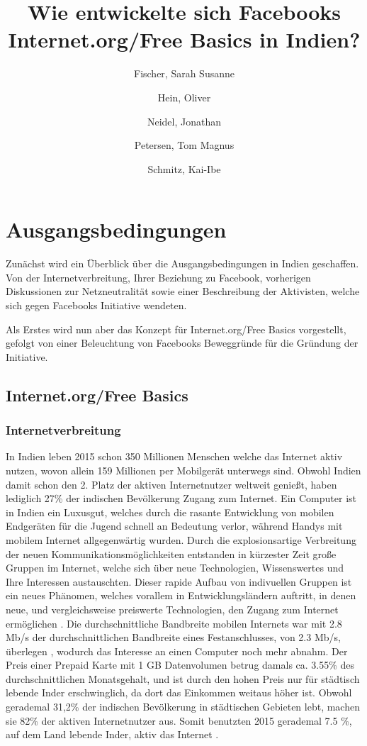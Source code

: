 \documentclass{article}
\title{Wie entwickelte sich Facebooks Internet.org/Free Basics in Indien?}
\author{
  Fischer, Sarah Susanne\\
  \and
  Hein, Oliver\\
  \and
  Neidel, Jonathan\\
  \and
  Petersen, Tom Magnus\\
  \and
  Schmitz, Kai-Ibe\\
}
\begin{document}
\maketitle

\section{Ausgangsbedingungen}

Zunächst wird ein Überblick über die Ausgangsbedingungen in Indien geschaffen. Von der Internetverbreitung, Ihrer Beziehung zu Facebook, vorherigen Diskussionen zur Netzneutralität sowie einer Beschreibung der Aktivisten, welche sich gegen Facebooks Initiative wendeten.

Als Erstes wird nun aber das Konzept für Internet.org/Free Basics vorgestellt, gefolgt von einer Beleuchtung von Facebooks Beweggründe für die Gründung der Initiative.

\subsection{Internet.org/Free Basics}

\subsubsection{Internetverbreitung}

In Indien leben 2015 schon 350 Millionen Menschen welche das Internet aktiv nutzen\autocite{slideshareIndia}, wovon allein 159 Millionen per Mobilgerät unterwegs sind.
Obwohl Indien damit schon den 2. Platz der aktiven Internetnutzer weltweit genießt, haben lediglich 27\% der indischen Bevölkerung Zugang zum Internet\autocite{InternetCountry}.
\medskip 
Ein Computer ist in Indien ein Luxusgut, welches durch die rasante Entwicklung von mobilen Endgeräten für die Jugend schnell an Bedeutung verlor, während Handys mit mobilem Internet allgegenwärtig wurden.
Durch die explosionsartige Verbreitung der neuen Kommunikationsmöglichkeiten entstanden in kürzester Zeit große Gruppen im Internet, welche sich über neue Technologien, Wissenswertes und Ihre Interessen austauschten.
Dieser rapide Aufbau von indivuellen Gruppen ist ein neues Phänomen, welches vorallem in Entwicklungsländern auftritt, in denen neue, und vergleichsweise preiswerte Technologien, den Zugang zum Internet ermöglichen \textcite{empowermentThroughFacebook}.
\medskip
Die durchschnittliche Bandbreite mobilen Internets war mit 2.8 Mb/s der durchschnittlichen Bandbreite eines Festanschlusses, von 2.3 Mb/s, überlegen \autocite{slideshareIndia}, wodurch das Interesse an einen Computer noch mehr abnahm.
Der Preis einer Prepaid Karte mit 1 GB Datenvolumen betrug damals ca. 3.55\% des durchschnittlichen Monatsgehalt\autocite{broadbandAgency}, und ist durch den hohen Preis nur für städtisch lebende Inder erschwinglich, da dort das Einkommen weitaus höher ist.
Obwohl gerademal 31,2\% der indischen Bevölkerung in städtischen Gebieten lebt, machen sie 82\% der aktiven Internetnutzer aus\autocite{IndiaBevölkerung}.
Somit benutzten 2015 gerademal 7.5 \%, auf dem Land lebende Inder, aktiv das Internet \autocite{slideshareIndia}.
\end{document}

